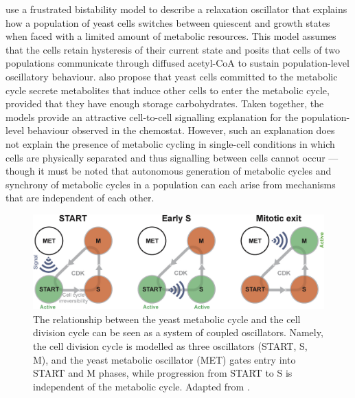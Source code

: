 \textcite{krishnaMinimalPushPull2018} use a frustrated bistability model to describe a relaxation oscillator that explains how a population of yeast cells switches between quiescent and growth states when faced with a limited amount of metabolic resources.
This model assumes that the cells retain hysteresis of their current state and posits that cells of two populations communicate through diffused acetyl-CoA to sustain population-level oscillatory behaviour.
\textcite{burnettiCellCycleStart2016} also propose that yeast cells committed to the metabolic cycle secrete metabolites that induce other cells to enter the metabolic cycle, provided that they have enough storage carbohydrates.
Taken together, the models provide an attractive cell-to-cell signalling explanation for the population-level behaviour observed in the chemostat.
However, such an explanation does not explain the presence of metabolic cycling in single-cell conditions in which cells are physically separated and thus signalling between cells cannot occur --- though it must be noted that autonomous generation of metabolic cycles and synchrony of metabolic cycles in a population can each arise from mechanisms that are independent of each other.

\begin{figure}
  \centering
  \includegraphics[width=1.0\textwidth]{ozsezenInferenceHighLevelInteraction2019_7}
  \caption{
    The relationship between the yeast metabolic cycle and the cell division cycle can be seen as a system of coupled oscillators.
    Namely, the cell division cycle is modelled as three oscillators (START, S, M), and the yeast metabolic oscillator (MET) gates entry into START and M phases, while progression from START to S is independent of the metabolic cycle.
    Adapted from \textcite{ozsezenInferenceHighLevelInteraction2019}.}
  \label{fig:intro-ymc-coupled_oscillators}
\end{figure}


